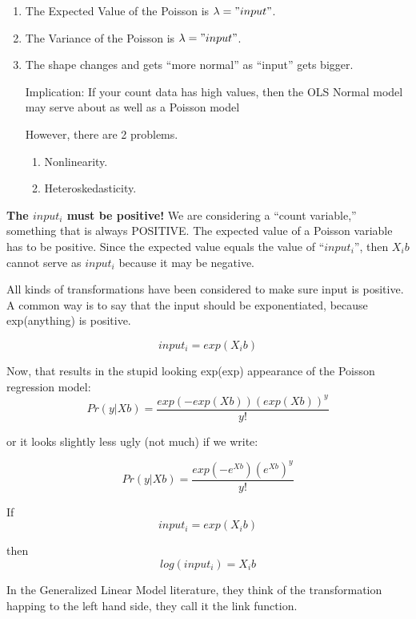 \documentclass[10pt,english]{beamer}
\def\lyxframeend{} %
\begin{document}
\lyxframeend{}
\begin{enumerate}
\item The Expected Value of the Poisson is $\lambda="input"$.
\item The Variance of the Poisson is $\lambda="input"$.
\item The shape changes and gets ``more normal'' as ``input'' gets bigger.


Implication: If your count data has high values, then the OLS Normal
model may serve about as well as a Poisson model


However, there are 2 problems.
\begin{enumerate}
\item Nonlinearity.
\item Heteroskedasticity.
\end{enumerate}
\end{enumerate}

\lyxframeend{}

\textbf{The $input_{i}$ must be positive!} We are considering a ``count
variable,'' something that is always POSITIVE. The expected value
of a Poisson variable has to be positive. Since the expected value
equals the value of ``$input_{i}$'', then $X_{i}b$ cannot serve
as $input_{i}$ because it may be negative. 

All kinds of transformations have been considered to make sure input
is positive. A common way is to say that the input should be exponentiated,
because exp(anything) is positive. 

\[
input_{i}=exp(X_{i}b)
\]


Now, that results in the stupid looking exp(exp) appearance of the
Poisson regression model:
\[
Pr(y|Xb)=\frac{exp(-exp(Xb))(exp(Xb))^{y}}{y!}
\]


or it looks slightly less ugly (not much) if we write:

\[
Pr(y|Xb)=\frac{exp(-e^{Xb})(e^{Xb})^{y}}{y!}
\]



\lyxframeend{}

If
\[
input_{i}=exp(X_{i}b)
\]


then
\[
log(input_{i})=X_{i}b
\]


In the Generalized Linear Model literature, they think of the transformation
happing to the left hand side, they call it the link function. 
\end{document}
